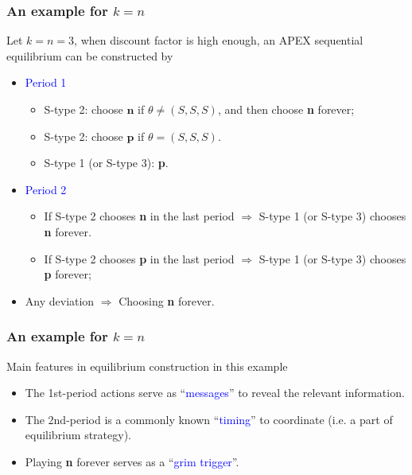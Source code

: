 \documentclass[8pt]{beamer}
\begin{document}
\begin{frame}
  \frametitle{An example for $k=n$}
\begin{center}
\end{center}

  
Let \alert{$k=n=3$}, when discount factor is high enough, an APEX sequential equilibrium can be constructed by
\begin{itemize}

\item \textcolor{blue}{Period 1}
\begin{itemize}
\item S-type 2: choose $\textbf{n}$ if $\theta\neq (S,S,S)$, and then choose \alert{\textbf{n} forever};
\item S-type 2: choose $\textbf{p}$ if $\theta=(S,S,S)$.
\item S-type 1 (or S-type 3): \textbf{p}.
\end{itemize}

\item \textcolor{blue}{Period 2}
\begin{itemize}
\item If S-type 2 chooses \textbf{n} in the last period $\Rightarrow$ S-type 1 (or S-type 3) chooses \alert{\textbf{n} forever}.
\item If S-type 2 chooses \textbf{p} in the last period $\Rightarrow$ S-type 1 (or S-type 3) chooses \textbf{p} forever; 
\end{itemize}
 
 \item Any deviation $\Rightarrow$ Choosing \alert<1->{\textbf{n} forever}.
\end{itemize}

\end{frame}


\begin{frame}
  \frametitle{An example for $k=n$}
Main features in equilibrium construction in this example
\begin{itemize}
\item The \alert{1st-period} actions serve as ``\textcolor{blue}{messages}'' to reveal the relevant information.
\item The \alert{2nd-period} is a commonly known ``\textcolor{blue}{timing}'' to coordinate (i.e. a part of equilibrium strategy).
\item \alert{Playing \textbf{n} forever} serves as a ``\textcolor{blue}{grim trigger}''.
\end{itemize}  
\end{frame}
\end{document}
